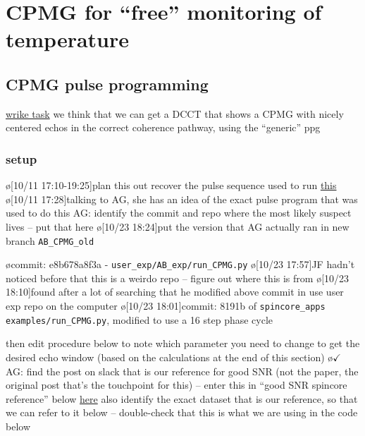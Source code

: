 \section{CPMG for ``free'' monitoring of temperature}
\subsection{CPMG pulse programming}
\href{https://www.wrike.com/open.htm?id=1185301634}{wrike task}
we think that we can get a DCCT that shows a CPMG with nicely centered echos in the correct coherence pathway, using the ``generic'' ppg

\subsubsection{setup}
\o[10/11 17:10-19:25]{plan this out}
recover the pulse sequence used to run \href{https://jmfrancklab.slack.com/archives/CLMMYDD98/p1655131101075819}{this}
\o[10/11 17:28]{talking to AG, she has an idea of the exact pulse program that was used to do this}
AG: identify the commit and repo where the most likely suspect lives -- put that here
\label{sec:identifyABCPMGppg}
\o[10/23 18:24]{put the version that AG actually ran in new branch \texttt{AB_CPMG_old}}
\begin{err}
    \o{commit: e8b678a8f3a - \texttt{user_exp/AB_exp/run_CPMG.py}}
    \o[10/23 17:57]{JF hadn't noticed before that this is a weirdo repo -- figure out where this is from}
    \o[10/23 18:10]{found after a lot of searching that he modified above commit in use user exp repo on the computer}
    \o[10/23 18:01]{commit: 8191b of \texttt{spincore_apps} \texttt{examples/run_CPMG.py}, modified to use a 16 step phase cycle}
\end{err}
then edit procedure below to note which parameter you need to change to get the desired echo window (based on the calculations at the end of this section)
\o{$\checkmark$}
AG: find the post on slack that is our reference for good SNR (not the paper, the original post that's the touchpoint for this) -- enter this in ``good SNR spincore reference'' below
\href{https://jmfrancklab.slack.com/archives/CLMMYDD98/p1679057089427599}{here}
also identify the exact dataset that is our reference, so that we can refer to it below -- double-check that this is what we are using in the code below

